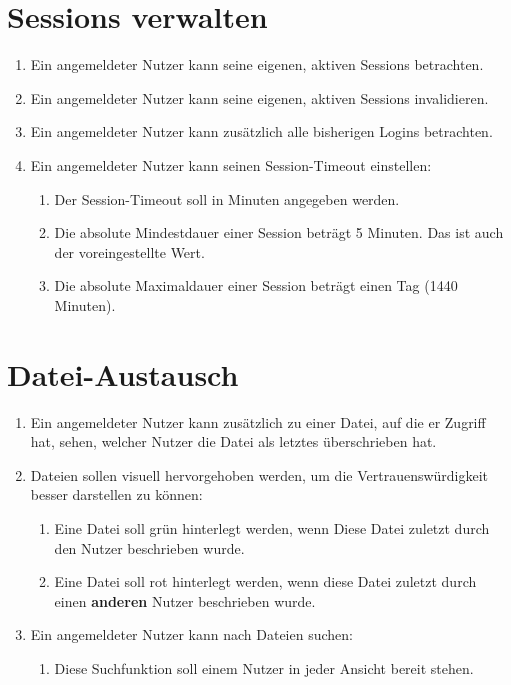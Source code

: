 \documentclass[12pt,DIV14,BCOR10mm,a4paper,parskip=half-,headsepline,headinclude,english,ngerman,bibliography=totocnumbered]{scrreprt}
\begin{document}
\chapter{Sessions verwalten}

\begin{enumerate}
    \item Ein angemeldeter Nutzer kann seine eigenen, aktiven Sessions betrachten.
    \item Ein angemeldeter Nutzer kann seine eigenen, aktiven Sessions invalidieren.
    \item Ein angemeldeter Nutzer kann zusätzlich alle bisherigen Logins betrachten.
    \item Ein angemeldeter Nutzer kann seinen Session-Timeout einstellen:
    \begin{enumerate}
        \item Der Session-Timeout soll in Minuten angegeben werden.
        \item Die absolute Mindestdauer einer Session beträgt 5 Minuten. Das ist auch der voreingestellte Wert.
        \item Die absolute Maximaldauer einer Session beträgt einen Tag (1440 Minuten).
    \end{enumerate}
\end{enumerate}

\chapter{Datei-Austausch}

\begin{enumerate}
    \item Ein angemeldeter Nutzer kann zusätzlich zu einer Datei, auf die er Zugriff hat, sehen, welcher Nutzer die Datei als letztes überschrieben hat.
    \item Dateien sollen visuell hervorgehoben werden, um die Vertrauenswürdigkeit besser darstellen zu können:
    \begin{enumerate}
        \item Eine Datei soll grün hinterlegt werden, wenn Diese Datei zuletzt durch den Nutzer beschrieben wurde.
        \item Eine Datei soll rot hinterlegt werden, wenn diese Datei zuletzt durch einen \textbf{anderen} Nutzer beschrieben wurde.
    \end{enumerate}
    \item Ein angemeldeter Nutzer kann nach Dateien suchen:
    \begin{enumerate}
        \item Diese Suchfunktion soll einem Nutzer in jeder Ansicht bereit stehen.
    \end{enumerate}
\end{enumerate}
\end{document}
